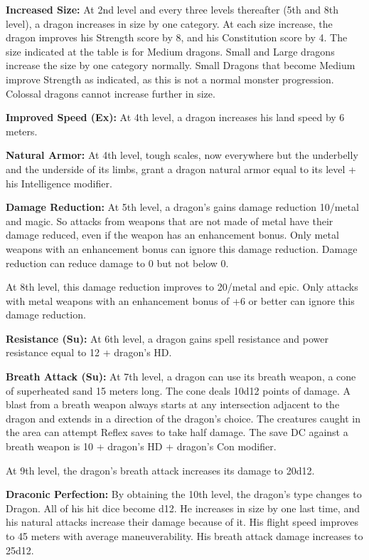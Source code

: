 {\textbf{Increased Size:} At 2nd level and every three levels thereafter (5th and 8th level), a dragon increases in size by one category. At each size increase, the dragon improves his Strength score by 8, and his Constitution score by 4. The size indicated at the table is for Medium dragons. Small and Large dragons increase the size by one category normally. Small Dragons that become Medium improve Strength as indicated, as this is not a normal monster progression. Colossal dragons cannot increase further in size.

\textbf{Improved Speed (Ex):} At 4th level, a dragon increases his land speed by 6 meters.

\textbf{Natural Armor:} At 4th level, tough scales, now everywhere but the underbelly and the underside of its limbs, grant a dragon natural armor equal to its level + his Intelligence modifier.

\textbf{Damage Reduction:} At 5th level, a dragon's gains damage reduction 10/metal and magic. So attacks from weapons that are not made of metal have their damage reduced, even if the weapon has an enhancement bonus. Only metal weapons with an enhancement bonus can ignore this damage reduction. Damage reduction can reduce damage to 0 but not below 0.

At 8th level, this damage reduction improves to 20/metal and epic. Only attacks with metal weapons with an enhancement bonus of +6 or better can ignore this damage reduction.

\textbf{Resistance (Su):} At 6th level, a dragon gains spell resistance and power resistance equal to 12 + dragon's HD.

\textbf{Breath Attack (Su):} At 7th level, a dragon can use its breath weapon, a cone of superheated sand 15 meters long. The cone deals 10d12 points of damage. A blast from a breath weapon always starts at any intersection adjacent to the dragon and extends in a direction of the dragon's choice. The creatures caught in the area can attempt Reflex saves to take half damage. The save DC against a breath weapon is 10 + dragon's HD + dragon's Con modifier.

At 9th level, the dragon's breath attack increases its damage to 20d12.

\textbf{Draconic Perfection:} By obtaining the 10th level, the dragon's type changes to Dragon. All of his hit dice become d12. He increases in size by one last time, and his natural attacks increase their damage because of it. His flight speed improves to 45 meters with average maneuverability. His breath attack damage increases to 25d12.

}
